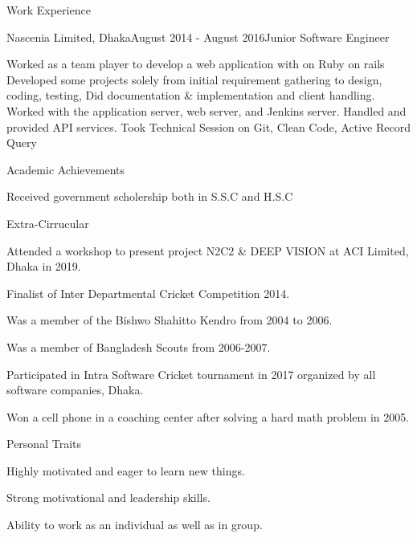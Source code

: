 \documentclass{resume} %
\begin{document}
\begin{rSection}{Work Experience}
\begin{rSubsection}{Nascenia Limited, Dhaka}{August 2014 - August 2016}{Junior Software Engineer}{}
\item 
Worked as a team player to develop a web application with on Ruby on rails
Developed some projects solely from initial requirement gathering to design, coding, testing,
Did documentation \& implementation and client handling.
Worked with the application server, web server, and Jenkins server.
Handled and provided API services. 
Took Technical Session on Git, Clean Code, Active Record Query 
\end{rSubsection}

\end{rSection}



\begin{rSection}{Academic Achievements} 
\item Received government scholership both in S.S.C  and H.S.C
\end{rSection}


\begin{rSection}{Extra-Cirrucular} \itemsep -3pt
\item Attended a workshop to present project N2C2 \& DEEP VISION at ACI Limited, Dhaka in 2019.
\item Finalist of Inter Departmental Cricket Competition 2014.
\item Was a member of the Bishwo Shahitto Kendro from 2004 to 2006.
\item Was a member of Bangladesh Scouts from 2006-2007.
\item  Participated in Intra Software Cricket tournament in 2017 organized by all software companies, Dhaka.
\item Won a cell phone in a coaching center after solving a hard math problem in 2005.


\end{rSection}

\begin{rSection}{Personal Traits}
\item Highly motivated and eager to learn new things.
\item Strong motivational and leadership skills.
\item Ability to work as an individual as well as in group.
\end{rSection}
\end{document}
